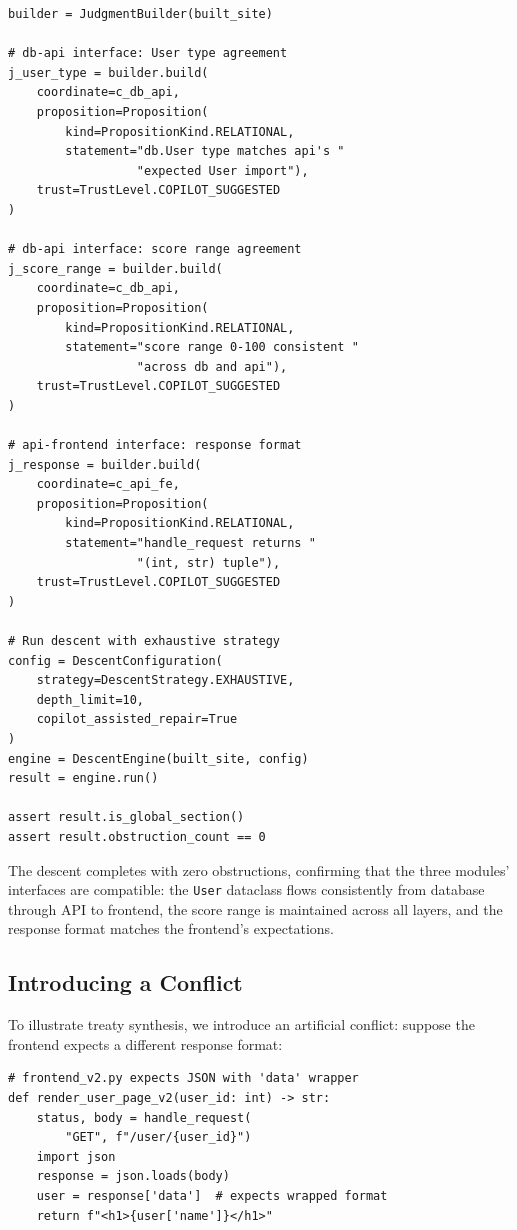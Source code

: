 \documentclass[11pt]{article}
\begin{document}
\begin{lstlisting}[style=jugeo-python,caption={Judgment construction for module interfaces.}]
builder = JudgmentBuilder(built_site)

# db-api interface: User type agreement
j_user_type = builder.build(
    coordinate=c_db_api,
    proposition=Proposition(
        kind=PropositionKind.RELATIONAL,
        statement="db.User type matches api's "
                  "expected User import"),
    trust=TrustLevel.COPILOT_SUGGESTED
)

# db-api interface: score range agreement
j_score_range = builder.build(
    coordinate=c_db_api,
    proposition=Proposition(
        kind=PropositionKind.RELATIONAL,
        statement="score range 0-100 consistent "
                  "across db and api"),
    trust=TrustLevel.COPILOT_SUGGESTED
)

# api-frontend interface: response format
j_response = builder.build(
    coordinate=c_api_fe,
    proposition=Proposition(
        kind=PropositionKind.RELATIONAL,
        statement="handle_request returns "
                  "(int, str) tuple"),
    trust=TrustLevel.COPILOT_SUGGESTED
)

# Run descent with exhaustive strategy
config = DescentConfiguration(
    strategy=DescentStrategy.EXHAUSTIVE,
    depth_limit=10,
    copilot_assisted_repair=True
)
engine = DescentEngine(built_site, config)
result = engine.run()

assert result.is_global_section()
assert result.obstruction_count == 0
\end{lstlisting}

The descent completes with zero obstructions, confirming that the
three modules' interfaces are compatible: the \texttt{User} dataclass
flows consistently from database through API to frontend, the score
range is maintained across all layers, and the response format matches
the frontend's expectations.

\subsection{Introducing a Conflict}

To illustrate treaty synthesis, we introduce an artificial conflict:
suppose the frontend expects a different response format:

\begin{lstlisting}[style=jugeo-python,caption={Conflicting frontend expectation.}]
# frontend_v2.py expects JSON with 'data' wrapper
def render_user_page_v2(user_id: int) -> str:
    status, body = handle_request(
        "GET", f"/user/{user_id}")
    import json
    response = json.loads(body)
    user = response['data']  # expects wrapped format
    return f"<h1>{user['name']}</h1>"
\end{lstlisting}
\end{document}
